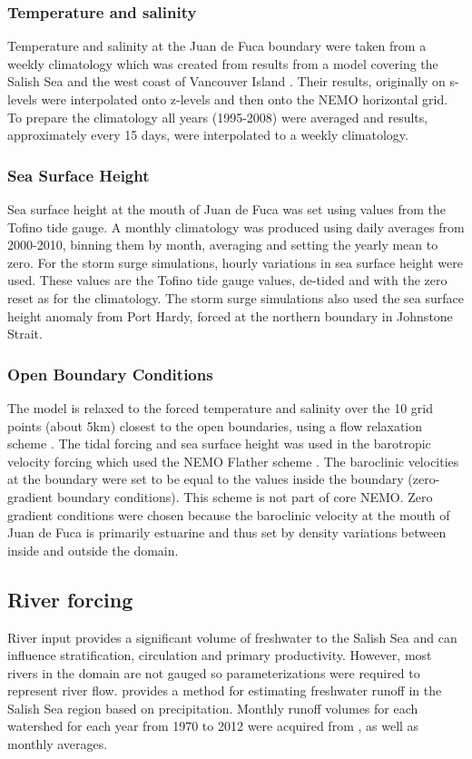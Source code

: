 \documentclass[pdftex,10pt]{article}
\begin{document}
\subsubsection{Temperature and salinity}
Temperature and salinity at the Juan de Fuca boundary were taken from a weekly climatology which was created from results from a model covering the Salish Sea and the west coast of Vancouver Island \citep{massonfine2012}.  Their results, originally on s-levels were interpolated onto z-levels and then onto the NEMO horizontal grid.  To prepare the climatology all years (1995-2008) were averaged and results, approximately every 15 days, were interpolated to a weekly climatology.

\subsubsection{Sea Surface Height}
Sea surface height at the mouth of Juan de Fuca was set using values from the Tofino tide gauge.  A monthly climatology was produced using daily averages from 2000-2010, binning them by month, averaging and setting the yearly mean to zero.  For the storm surge simulations, hourly variations in sea surface height were used.  These values are the Tofino tide gauge values, de-tided and with the zero reset as for the climatology. The storm surge simulations also used the sea surface height anomaly from Port Hardy, forced at the northern boundary in Johnstone Strait. 

\subsubsection{Open Boundary Conditions}

The model is relaxed to the forced temperature and salinity over the 10 grid points (about 5km) closest to the open boundaries, using a flow relaxation scheme \citep{engedahl1995use}. %
The tidal forcing and sea surface height was used in the barotropic velocity forcing which used the NEMO Flather scheme \citep{flather1994storm, madec2008nemo}.
The baroclinic velocities at the boundary were set to be equal to the values inside the boundary (zero-gradient boundary conditions).  This scheme is not part of core NEMO.  Zero gradient conditions were chosen because the baroclinic velocity at the mouth of Juan de Fuca is primarily estuarine and thus set by density variations between inside and outside the domain.

\subsection{River forcing}
River input provides a significant volume of freshwater to the Salish Sea and can influence stratification, circulation and primary productivity. However, most rivers in the domain are not gauged so parameterizations were required to represent river flow. \citet{morrison2011rivers} provides a method for estimating freshwater runoff in the Salish Sea region based on precipitation. Monthly runoff volumes for each watershed for each year from 1970 to 2012 were acquired from \citet{morrison2011rivers}, as well as monthly averages. 
\end{document}
